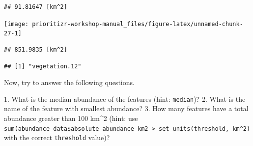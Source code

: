\documentclass[12pt,]{book}
\makeatletter
\newenvironment{Shaded}{\begin{snugshade}}{\end{snugshade}}
\newcommand{\KeywordTok}[1]{\textcolor[rgb]{0.13,0.29,0.53}{\textbf{#1}}}
\newcommand{\DataTypeTok}[1]{\textcolor[rgb]{0.13,0.29,0.53}{#1}}
\newcommand{\StringTok}[1]{\textcolor[rgb]{0.31,0.60,0.02}{#1}}
\newcommand{\CommentTok}[1]{\textcolor[rgb]{0.56,0.35,0.01}{\textit{#1}}}
\newcommand{\OperatorTok}[1]{\textcolor[rgb]{0.81,0.36,0.00}{\textbf{#1}}}
\newcommand{\NormalTok}[1]{#1}
\newenvironment{kframe}{%
\medskip{}
\setlength{\fboxsep}{.8em}
 \def\at@end@of@kframe{}%
 \ifinner\ifhmode%
  \def\at@end@of@kframe{\end{minipage}}%
  \begin{minipage}{\columnwidth}%
 \fi\fi%
 \def\FrameCommand##1{\hskip\@totalleftmargin \hskip-\fboxsep
 \colorbox{shadecolor}{##1}\hskip-\fboxsep
     \hskip-\linewidth \hskip-\@totalleftmargin \hskip\columnwidth}%
 \MakeFramed {\advance\hsize-\width
   \@totalleftmargin\z@ \linewidth\hsize
   \@setminipage}}%
 {\par\unskip\endMakeFramed%
 \at@end@of@kframe}
\newenvironment{rmdblock}[1]
  {
  \begin{itemize}
  \renewcommand{\labelitemi}{
    \raisebox{-.7\height}[0pt][0pt]{
      {\setkeys{Gin}{width=3em,keepaspectratio}\texttt{[image: images/\#1]}}
    }
  }
  \setlength{\fboxsep}{1em}
  \begin{kframe}
  \item
  }
  {
  \end{kframe}
  \end{itemize}
  }
\newenvironment{rmdquestion}
  {\begin{rmdblock}{question}}
  {\end{rmdblock}}
\makeatother
\begin{document}
\begin{verbatim}
## 91.81647 [km^2]
\end{verbatim}

\begin{Shaded}
\end{Shaded}

\begin{center}\texttt{[image: prioritizr-workshop-manual\_files/figure-latex/unnamed-chunk-27-1]} \end{center}

\begin{Shaded}
\end{Shaded}

\begin{verbatim}
## 851.9835 [km^2]
\end{verbatim}

\begin{Shaded}
\end{Shaded}

\begin{verbatim}
## [1] "vegetation.12"
\end{verbatim}

Now, try to answer the following questions.

\begin{rmdquestion} 1. What is the median abundance of the
features (hint: \texttt{median})? 2. What is the name of the feature
with smallest abundance? 3. How many features have a total abundance
greater than 100 km\^{}2 (hint: use
\texttt{sum(abundance\_data\$absolute\_abundance\_km2\ \textgreater{}\ set\_units(threshold,\ km\^{}2)}
with the correct \texttt{threshold} value)?
\end{rmdquestion}
\end{document}
